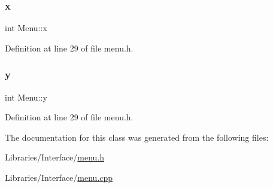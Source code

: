 \subsubsection{\texorpdfstring{x}{x}}
{\footnotesize\ttfamily int Menu\+::x\hspace{0.3cm}{\ttfamily [private]}}



Definition at line 29 of file menu.\+h.

\mbox{\label{class_menu_a658438f1d47ccb1cfb78b14fe3e09b52}} 
\subsubsection{\texorpdfstring{y}{y}}
{\footnotesize\ttfamily int Menu\+::y\hspace{0.3cm}{\ttfamily [private]}}



Definition at line 29 of file menu.\+h.



The documentation for this class was generated from the following files\+:\begin{DoxyCompactItemize}
\item 
Libraries/\+Interface/\mbox{\hyperlink{menu_8h}{menu.\+h}}\item 
Libraries/\+Interface/\mbox{\hyperlink{menu_8cpp}{menu.\+cpp}}\end{DoxyCompactItemize}
